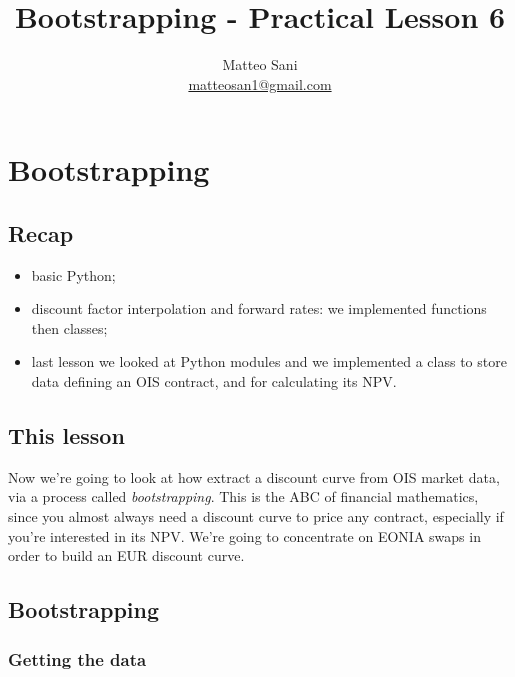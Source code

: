 \documentclass[11pt]{article}
\title{Bootstrapping - Practical Lesson 6}
\author{Matteo Sani \\ \href{mailto:matteosan1@gmail.com}{matteosan1@gmail.com}}
\providecommand{\tightlist}{%
      \setlength{\itemsep}{0pt}\setlength{\parskip}{0pt}}
\begin{document}
    
    
    \maketitle
    
    

    
    \hypertarget{bootstrapping---lesson-6}{%
\section{Bootstrapping}\label{bootstrapping---lesson-6}}

\hypertarget{recap}{%
\subsection{Recap}\label{recap}}

\begin{itemize}
\tightlist
\item
  basic Python;
\item
  discount factor interpolation and forward rates: we implemented
  functions then classes;
\item
  last lesson we looked at Python modules and we implemented a class to
  store data defining an OIS contract, and for calculating its NPV.
\end{itemize}

\hypertarget{this-lesson}{%
\subsection{This lesson}\label{this-lesson}}

Now we're going to look at how extract a discount curve from OIS market
data, via a process called \emph{bootstrapping}. This is the ABC of
financial mathematics, since you almost always need a discount curve to
price any contract, especially if you're interested in its NPV. We're
going to concentrate on EONIA swaps in order to build an EUR discount
curve.

    \hypertarget{bootstrapping}{%
\subsection{Bootstrapping}\label{bootstrapping}}

\hypertarget{getting-the-data}{%
\subsubsection{Getting the data}\label{getting-the-data}}
\end{document}
